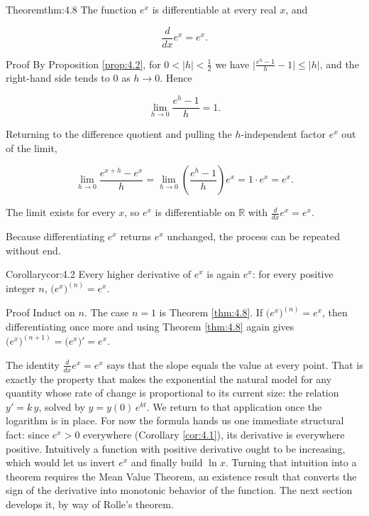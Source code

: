 \documentclass[a4paper,12pt,oneside]{memoir}
\begin{document}
\begin{envtheorem}{Theorem}{thm:4.8}{}
The function \(e^{x}\) is differentiable at every real \(x\), and

\[ \frac{d}{dx} e^{x} = e^{x}. \]
\end{envtheorem}
\begin{envproof}{Proof}{}{}
By Proposition \ref{prop:4.2}, for \(0 < \lvert h \rvert < \tfrac{1}{2}\) we have \(\bigl\lvert \tfrac{e^{h} - 1}{h} - 1 \bigr\rvert \le \lvert h \rvert\), and the right-hand side tends to \(0\) as \(h \to 0\). Hence

\[ \lim_{h \to 0} \frac{e^{h} - 1}{h} = 1. \]

Returning to the difference quotient and pulling the \(h\)-independent factor \(e^{x}\) out of the limit,

\[ \lim_{h \to 0} \frac{e^{x + h} - e^{x}}{h} = \lim_{h \to 0} \left( \frac{e^{h} - 1}{h} \right) e^{x} = 1 \cdot e^{x} = e^{x}. \]

The limit exists for every \(x\), so \(e^{x}\) is differentiable on \(\mathbb{R}\) with \(\frac{d}{dx} e^{x} = e^{x}\). \qedmark
\end{envproof}
Because differentiating \(e^{x}\) returns \(e^{x}\) unchanged, the process can be repeated without end.

\begin{envcorollary}{Corollary}{cor:4.2}{}
Every higher derivative of \(e^{x}\) is again \(e^{x}\): for every positive integer \(n\), \(\bigl(e^{x}\bigr)^{(n)} = e^{x}\).
\end{envcorollary}
\begin{envproof}{Proof}{}{}
Induct on \(n\). The case \(n = 1\) is Theorem \ref{thm:4.8}. If \(\bigl(e^{x}\bigr)^{(n)} = e^{x}\), then differentiating once more and using Theorem \ref{thm:4.8} again gives \(\bigl(e^{x}\bigr)^{(n + 1)} = \bigl(e^{x}\bigr)' = e^{x}\). \qedmark
\end{envproof}
The identity \(\frac{d}{dx} e^{x} = e^{x}\) says that the slope equals the value at every point. That is exactly the property that makes the exponential the natural model for any quantity whose rate of change is proportional to its current size: the relation \(y' = k\,y\), solved by \(y = y(0)\,e^{kt}\). We return to that application once the logarithm is in place. For now the formula hands us one immediate structural fact: since \(e^{x} > 0\) everywhere (Corollary \ref{cor:4.1}), its derivative is everywhere positive. Intuitively a function with positive derivative ought to be increasing, which would let us invert \(e^{x}\) and finally build \(\ln x\). Turning that intuition into a theorem requires the Mean Value Theorem, an existence result that converts the sign of the derivative into monotonic behavior of the function. The next section develops it, by way of Rolle’s theorem.
\end{document}
